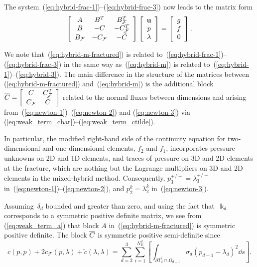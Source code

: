 The system~(\ref{eq:hybrid-frac-1})--(\ref{eq:hybrid-frac-3}) now leads to the
matrix form
\begin{equation}
\left[
\begin{array}
[c]{ccc}%
A & B^{T} & B_{\mathcal{F}}^{T}\\
B & -C & -C_{\mathcal{F}}^{T}\\
B_{\mathcal{F}} & -C_{\mathcal{F}} & -\widetilde{C}%
\end{array}
\right]  \left[
\begin{array}
[c]{c}%
\mathbf{u}\\
p\\
\lambda
\end{array}
\right]  =\left[
\begin{array}
[c]{c}%
g\\
f\\
0
\end{array}
\right]  . \label{eq:hybrid-m-fractured}%
\end{equation}


We note that~(\ref{eq:hybrid-m-fractured}) is related
to~(\ref{eq:hybrid-frac-1})--(\ref{eq:hybrid-frac-3}) in the same way
as~(\ref{eq:hybrid-m}) is related to~(\ref{eq:hybrid-1})--(\ref{eq:hybrid-3}).
The main difference in the structure of the matrices
between (\ref{eq:hybrid-m-fractured}) and~(\ref{eq:hybrid-m}) is the additional
block $\ol{C}=\left[
\begin{array}
[c]{cc}%
C & C_{\mathcal{F}}^{T}\\
C_{\mathcal{F}} & \widetilde{C}%
\end{array}
\right]  $ related to the normal fluxes between dimensions and arising
from~(\ref{eq:newton-1})--(\ref{eq:newton-2}) and (\ref{eq:newton-3}) via
(\ref{eq:weak_term_cbar})--(\ref{eq:weak_term_ctilde}).

In particular, 
the modified right-hand side of the continuity equation for two-dimensional and one-dimensional  
elements, $f_{2}$ and $f_{1}$, incorporates pressure unknowns on 2D and 1D  elements, 
and traces of pressure on 3D and 2D elements at the fracture, 
which are nothing but the Lagrange multipliers on 3D and 2D elements in the mixed-hybrid method.
Consequently, 
$p_{3}^{+/-} = \lambda_{3}^{+/-}$ in~(\ref{eq:newton-1})--(\ref{eq:newton-2}), and $p_{2}^{k} = \lambda_{2}^{k}$ in~(\ref{eq:newton-3}).


Assuming~$\delta_{d}$ bounded and greater than zero, and using the fact
that~$\Bbbk_{d}$ corresponds to a symmetric positive definite matrix, we see
from (\ref{eq:weak_term_a}) that block $A$ in~(\ref{eq:hybrid-m-fractured}) is
symmetric positive definite. The block $\overline{C}$ is symmetric positive semi-definite
since
\begin{equation}
\label{eq:C_semi_definite}c(p,p) + 2c_{\mathcal{F}}(p,\lambda) +
\widetilde{c}(\lambda, \lambda) = \sum_{d=2}^{3}\sum_{i=1}^{N_{E}^{d}}\left[
\int_{\partial T_{d}^{i} \cap\Omega_{d-1}} \sigma_{d} (p_{d-1} - \lambda
_{d})^{2} \dd s \right]  .
\end{equation}

